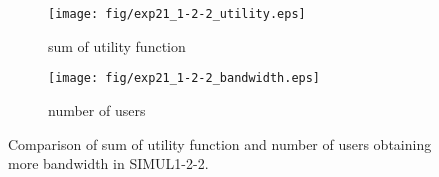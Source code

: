 	\begin{figure}
		\begin{center}
			\begin{subfigure}[b]{0.8\textwidth}
				\centering
				\texttt{[image: fig/exp21\_1-2-2\_utility.eps]}
				\caption{sum of utility function}
				\label{figure:simul1_2_2_u_a}
			\end{subfigure}
			\begin{subfigure}[b]{0.8\textwidth}
				\centering
				\texttt{[image: fig/exp21\_1-2-2\_bandwidth.eps]}
				\caption{number of users}
				\label{figure:simul1_2_2_u_b}
			\end{subfigure}
			\caption{Comparison of sum of utility function and number of users obtaining more bandwidth in SIMUL1-2-2.}
			\label{figure:simul1_2_2_u}
		\end{center}
	\end{figure}

\clearpage

